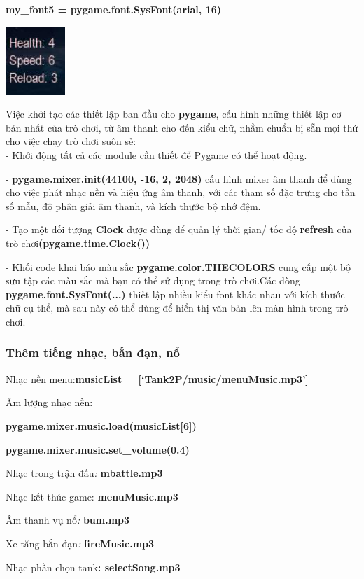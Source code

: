 \documentclass[a4paper]{article}
\begin{document}
\textbf{my\_font5 =
pygame.font.SysFont(\textquotesingle arial\textquotesingle, 16)}

\includegraphics[width=0.88472in,height=1.01111in]{image71.png}

Việc khởi tạo các thiết lập ban đầu cho \textbf{pygame}, cấu hình những
thiết lập cơ bản nhất của trò chơi, từ âm thanh cho đến kiểu chữ, nhằm
chuẩn bị sẵn mọi thứ cho việc chạy trò chơi suôn sẻ:\\
- Khởi động tất cả các module cần thiết để Pygame có thể hoạt động.

- \textbf{pygame.mixer.init(44100, -16, 2, 2048)} cấu hình mixer âm
thanh để dùng cho việc phát nhạc nền và hiệu ứng âm thanh, với các tham
số đặc trưng cho tần số mẫu, độ phân giải âm thanh, và kích thước bộ nhớ
đệm.

- Tạo một đối tượng \textbf{Clock} được dùng để quản lý thời gian/ tốc
độ \textbf{refresh} của trò chơi\textbf{(pygame.time.Clock())}

- Khối code khai báo màu sắc \textbf{pygame.color.THECOLORS} cung cấp
một bộ sưu tập các màu sắc mà bạn có thể sử dụng trong trò chơi.Các dòng
\textbf{pygame.font.SysFont(...)} thiết lập nhiều kiểu font khác nhau
với kích thước chữ cụ thể, mà sau này có thể dùng để hiển thị văn bản
lên màn hình trong trò chơi.
\subsubsection{Thêm tiếng nhạc, bắn đạn, nổ}
Nhạc nền menu:\textbf{musicList = {[}`Tank2P/music/menuMusic.mp3'{]}}

Âm lượng nhạc nền:

\textbf{pygame.mixer.music.load(musicList{[}6{]})}

\textbf{pygame.mixer.music.set\_volume(0.4)}

Nhạc trong trận đấu\emph{:} \textbf{mbattle.mp3}

Nhạc kết thúc game: \textbf{menuMusic.mp3}

Âm thanh vụ nổ\emph{:} \textbf{bum.mp3}

Xe tăng bắn đạn\emph{:} \textbf{fireMusic.mp3}

Nhạc phần chọn tank\textbf{: selectSong.mp3}
\end{document}
